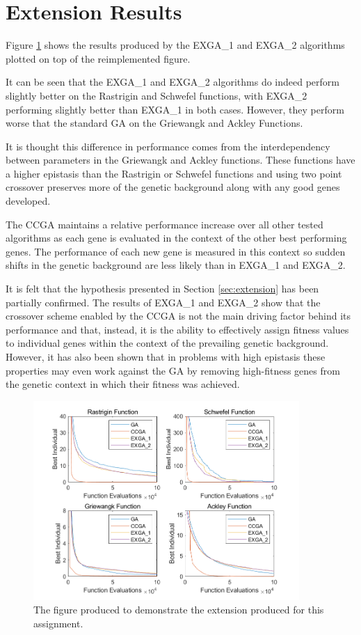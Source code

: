 \section{Extension Results} \label{sec:extension-results}

Figure \ref{fig:extension_plot} shows the results produced by the EXGA\_1 and EXGA\_2 algorithms plotted on top of the reimplemented figure. 

It can be seen that the EXGA\_1 and EXGA\_2 algorithms do indeed perform slightly better on the Rastrigin and Schwefel functions, with EXGA\_2 performing slightly better than EXGA\_1 in both cases.
However, they perform worse that the standard GA on the Griewangk and Ackley Functions.

It is thought this difference in performance comes from the interdependency between parameters in the Griewangk and Ackley functions. 
These functions have a higher epistasis than the Rastrigin or Schwefel functions and using two point crossover preserves more of the genetic background along with any good genes developed.

The CCGA maintains a relative performance increase over all other tested algorithms as each gene is evaluated in the context of the other best performing genes. 
The performance of each new gene is measured in this context so sudden shifts in the genetic background are less likely than in EXGA\_1 and EXGA\_2.

It is felt that the hypothesis presented in Section \ref{sec:extension} has been partially confirmed.
The results of EXGA\_1 and EXGA\_2 show that the crossover scheme enabled by the CCGA is not the main driving factor behind its performance and that, instead, it is the ability to effectively assign fitness values to individual genes within the context of the prevailing genetic background.
However, it has also been shown that in problems with high epistasis these properties may even work against the GA by removing high-fitness genes from the genetic context in which their fitness was achieved. 

\begin{figure}[ht!]
    \centering 
    \includegraphics[width=0.9\textwidth]{img/extension_plot.png}
    \caption{The figure produced to demonstrate the extension produced for this assignment.}
    \label{fig:extension_plot}
  \end{figure}
